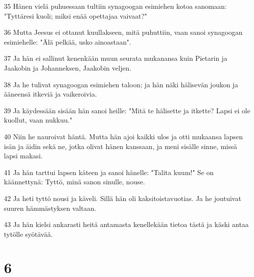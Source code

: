 \par 35 Hänen vielä puhuessaan tultiin synagoogan esimiehen kotoa sanomaan: "Tyttäresi kuoli; miksi enää opettajaa vaivaat?"
\par 36 Mutta Jeesus ei ottanut kuullakseen, mitä puhuttiin, vaan sanoi synagoogan esimiehelle: "Älä pelkää, usko ainoastaan".
\par 37 Ja hän ei sallinut kenenkään muun seurata mukanansa kuin Pietarin ja Jaakobin ja Johanneksen, Jaakobin veljen.
\par 38 Ja he tulivat synagoogan esimiehen taloon; ja hän näki hälisevän joukon ja ääneensä itkeviä ja vaikeroivia.
\par 39 Ja käydessään sisään hän sanoi heille: "Mitä te hälisette ja itkette? Lapsi ei ole kuollut, vaan nukkuu."
\par 40 Niin he nauroivat häntä. Mutta hän ajoi kaikki ulos ja otti mukaansa lapsen isän ja äidin sekä ne, jotka olivat hänen kanssaan, ja meni sisälle sinne, missä lapsi makasi.
\par 41 Ja hän tarttui lapsen käteen ja sanoi hänelle: "Talita kuum!" Se on käännettynä: Tyttö, minä sanon sinulle, nouse.
\par 42 Ja heti tyttö nousi ja käveli. Sillä hän oli kaksitoistavuotias. Ja he joutuivat suuren hämmästyksen valtaan.
\par 43 Ja hän kielsi ankarasti heitä antamasta kenellekään tietoa tästä ja käski antaa tytölle syötävää.

\chapter{6}

